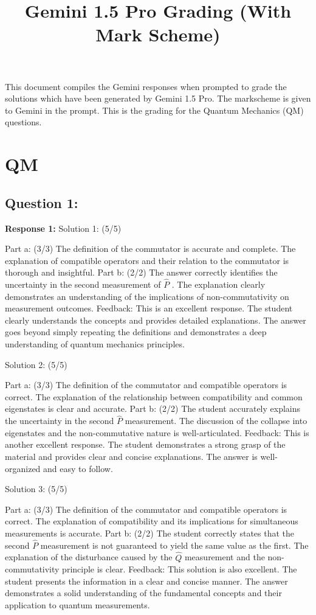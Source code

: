 \documentclass[a4paper,11pt]{article}
\begin{document}
    
\title{Gemini 1.5 Pro Grading (With Mark Scheme)}

\maketitle

This document compiles the Gemini responses when prompted to grade the solutions which have been generated by Gemini 1.5 Pro. The markscheme is given to Gemini in the prompt. This is the grading for the Quantum Mechanics (QM) questions. 

\section{QM}

\subsection*{Question 1:}

\textbf{Response 1:}
Solution 1: (5/5)

Part a: (3/3)
The definition of the commutator is accurate and complete.
The explanation of compatible operators and their relation to the commutator is thorough and insightful.
Part b: (2/2)
The answer correctly identifies the uncertainty in the second measurement of \(\hat{P}\) .
The explanation clearly demonstrates an understanding of the implications of non-commutativity on measurement outcomes.
Feedback: This is an excellent response. The student clearly understands the concepts and provides detailed explanations. The answer goes beyond simply repeating the definitions and demonstrates a deep understanding of quantum mechanics principles.

Solution 2: (5/5)

Part a: (3/3)
The definition of the commutator and compatible operators is correct.
The explanation of the relationship between compatibility and common eigenstates is clear and accurate.
Part b: (2/2)
The student accurately explains the uncertainty in the second \(\hat{P}\) measurement.
The discussion of the collapse into eigenstates and the non-commutative nature is well-articulated.
Feedback: This is another excellent response. The student demonstrates a strong grasp of the material and provides clear and concise explanations. The answer is well-organized and easy to follow.

Solution 3: (5/5)

Part a: (3/3)
The definition of the commutator and compatible operators is correct.
The explanation of compatibility and its implications for simultaneous measurements is accurate.
Part b: (2/2)
The student correctly states that the second \(\hat{P}\) measurement is not guaranteed to yield the same value as the first.
The explanation of the disturbance caused by the \(\hat{Q}\) measurement and the non-commutativity principle is clear.
Feedback: This solution is also excellent. The student presents the information in a clear and concise manner. The answer demonstrates a solid understanding of the fundamental concepts and their application to quantum measurements.
\end{document}
